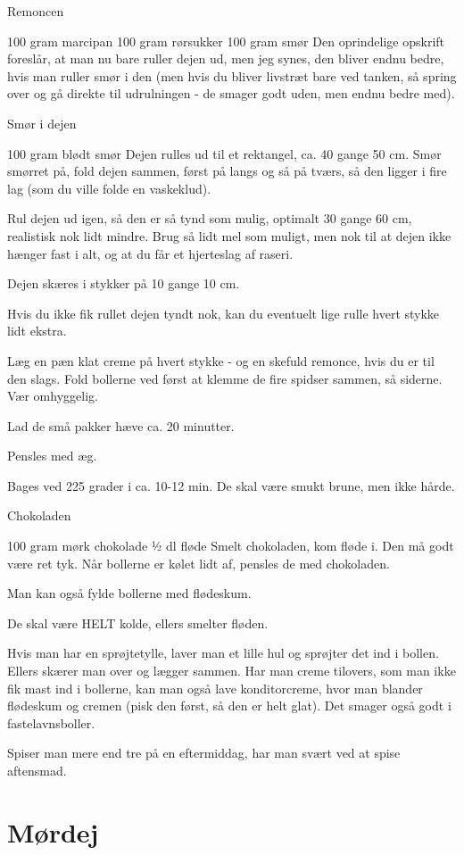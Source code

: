 \documentclass[
]{book}
\begin{document}
Remoncen

100 gram marcipan 100 gram rørsukker 100 gram smør Den oprindelige opskrift foreslår, at man nu bare ruller dejen ud, men jeg synes, den bliver endnu bedre, hvis man ruller smør i den (men hvis du bliver livstræt bare ved tanken, så spring over og gå direkte til udrulningen - de smager godt uden, men endnu bedre med).

Smør i dejen

100 gram blødt smør Dejen rulles ud til et rektangel, ca. 40 gange 50 cm. Smør smørret på, fold dejen sammen, først på langs og så på tværs, så den ligger i fire lag (som du ville folde en vaskeklud).

Rul dejen ud igen, så den er så tynd som mulig, optimalt 30 gange 60 cm, realistisk nok lidt mindre. Brug så lidt mel som muligt, men nok til at dejen ikke hænger fast i alt, og at du får et hjerteslag af raseri.

Dejen skæres i stykker på 10 gange 10 cm.

Hvis du ikke fik rullet dejen tyndt nok, kan du eventuelt lige rulle hvert stykke lidt ekstra.

Læg en pæn klat creme på hvert stykke - og en skefuld remonce, hvis du er til den slags. Fold bollerne ved først at klemme de fire spidser sammen, så siderne. Vær omhyggelig.

Lad de små pakker hæve ca. 20 minutter.

Pensles med æg.

Bages ved 225 grader i ca. 10-12 min. De skal være smukt brune, men ikke hårde.

Chokoladen

100 gram mørk chokolade ½ dl fløde Smelt chokoladen, kom fløde i. Den må godt være ret tyk. Når bollerne er kølet lidt af, pensles de med chokoladen.

Man kan også fylde bollerne med flødeskum.

De skal være HELT kolde, ellers smelter fløden.

Hvis man har en sprøjtetylle, laver man et lille hul og sprøjter det ind i bollen. Ellers skærer man over og lægger sammen. Har man creme tilovers, som man ikke fik mast ind i bollerne, kan man også lave konditorcreme, hvor man blander flødeskum og cremen (pisk den først, så den er helt glat). Det smager også godt i fastelavnsboller.

Spiser man mere end tre på en eftermiddag, har man svært ved at spise aftensmad.

\section{Mørdej}\label{muxf8rdej}
\end{document}
